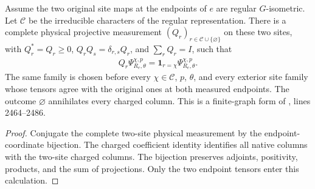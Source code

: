 \begin{lemma}
    \label{thm:peps_regular_edge_physical_charge_measurement}
    \leanok
    Assume the two original site maps at the endpoints of $e$ are regular
    $G$-isometric. Let $\mathcal C$ be the irreducible characters of the
    regular representation. There is a complete physical projective measurement
    $(Q_r)_{r\in\mathcal C\cup\{\varnothing\}}$ on these two sites, with
    $Q_r^*=Q_r\geq0$, $Q_rQ_s=\delta_{r,s}Q_r$, and $\sum_rQ_r=I$, such that
    \begin{align}
        Q_r\Psi^{\chi,p}_{R_e,\theta}
        =\mathbf1_{r=\chi}\Psi^{\chi,p}_{R_e,\theta}.
    \end{align}
    The same family is chosen before every $\chi\in\mathcal C$, $p$, $\theta$,
    and every exterior site family whose tensors agree with the original ones at
    both measured endpoints. The outcome $\varnothing$ annihilates every charged
    column. This is a finite-graph form of
    \cite[Detection of chargeons]{Schuch2010PEPS}, lines 2464--2486.
\end{lemma}
\begin{proof}\leanok
    Conjugate the complete two-site physical measurement by the
    endpoint-coordinate bijection. The charged coefficient identity
    identifies all native columns with the two-site charged columns. The
    bijection preserves adjoints, positivity, products, and the sum of projections.
    Only the two endpoint tensors enter this calculation.
\end{proof}
